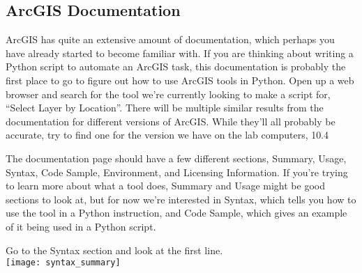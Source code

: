 \documentclass{article}
\begin{document}
\subsection{ArcGIS Documentation}
ArcGIS has quite an extensive amount of documentation, which perhaps you have already started to become familiar with.  If you are thinking about writing a Python script to automate an ArcGIS task, this documentation is probably the first place to go to figure out how to use ArcGIS tools in Python.  Open up a web browser and search for the tool we're currently looking to make a script for, ``Select Layer by Location''.  There will be multiple similar results from the documentation for different versions of ArcGIS.  While they'll all probably be accurate, try to find one for the version we have on the lab computers, 10.4

The documentation page should have a few different sections, Summary, Usage, Syntax, Code Sample, Environment, and Licensing Information.  If you're trying to learn more about what a tool does, Summary and Usage might be good sections to look at, but for now we're interested in Syntax, which tells you how to use the tool in a Python instruction, and Code Sample, which gives an example of it being used in a Python script.

Go to the Syntax section and look at the first line.\\
    \texttt{[image: syntax\_summary]}
\end{document}
